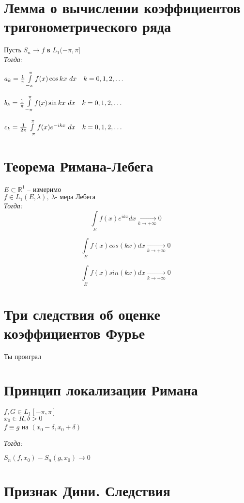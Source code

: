    \section{Лемма о вычислении коэффициентов тригонометрического ряда}

    Пусть $S_n \rightarrow f$ в $L_1(-\pi, \pi]$\\

    \emph{Тогда}:

    $a_k = \frac{1}{\pi}\int\limits_{-\pi}^{\pi}f(x)\cos kx\ dx \quad k = 0, 1, 2, \mathellipsis$

    $b_k = \frac{1}{\pi}\int\limits_{-\pi}^{\pi}f(x)\sin kx\ dx \quad k = 0, 1, 2, \mathellipsis$

    $c_k = \frac{1}{2\pi}\int\limits_{-\pi}^{\pi}f(x)e^{-ikx}\ dx \quad k = 0, 1, 2, \mathellipsis$

    \section{Теорема Римана-Лебега}
    $E \subset \mathds{R}^1$ -- измеримо\\ $f \in L_1(E, \lambda), ~ \lambda \text{- мера Лебега}$ \\
    \emph{Тогда:}
    $$\int\limits_{E}f(x)e^{ikx}dx \xrightarrow[k \to +\infty]{} 0$$

    $$\int\limits_{E}f(x)cos(kx)dx \xrightarrow[k \to +\infty]{} 0$$

    $$\int\limits_{E}f(x)sin(kx)dx \xrightarrow[k \to +\infty]{} 0$$
    \section{Три следствия об оценке коэффициентов Фурье}
    Ты проиграл

    \section{Принцип локализации Римана}

    $ f, G \in L_1[-\pi, \pi] $\\
    $ x_0 \in R, \delta > 0 $\\
    $ f \equiv g $ на $ (x_0 - \delta, x_0 + \delta) $

    \emph{Тогда:}

    $ S_n(f, x_0) - S_n(g, x_0) \to 0 $

    \section{Признак Дини. Следствия}


